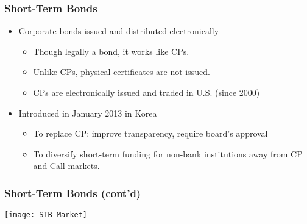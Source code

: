 \documentclass[10pt]{beamer}
\begin{document}
	
	
	
	
	\begin{frame}
		\frametitle{Short-Term Bonds}
		
		\begin{itemize}  \vspace{5pt} \itemsep10pt
			\item Corporate bonds issued and distributed electronically 
			
			\begin{itemize}  \vspace{5pt} \itemsep10pt
				\item Though legally a bond, it works like CPs. 
				\item Unlike CPs, physical certificates are not issued.
				\item CPs are electronically issued and traded in U.S. (since 2000)
			\end{itemize}		
			
			\item Introduced in January 2013 in Korea
			\begin{itemize}  \vspace{5pt} \itemsep10pt
				\item To replace CP: improve transparency, require board's approval
				\item To diversify short-term funding for non-bank institutions away from CP and Call markets.
			\end{itemize}
			
			
		\end{itemize}		
		
	\end{frame}
	
	
	
	\begin{frame}
		\frametitle{Short-Term Bonds (cont'd)} %
		\begin{center}
			\texttt{[image: STB\_Market]}
		\end{center}
		
	\end{frame}
	
\end{document}
